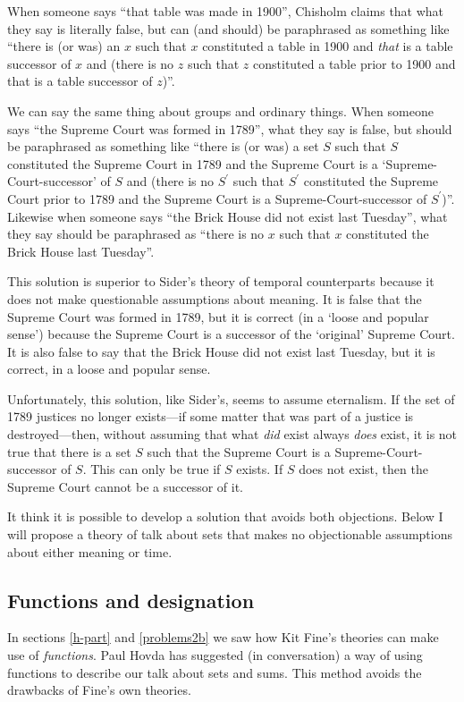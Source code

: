 \documentclass[11pt]{article}
\begin{document}
\begin{spacing}{1.5}
When someone says ``that table was made in 1900'', Chisholm claims
that what they say is literally false, but can (and should) be
paraphrased as something like ``there is (or was) an $x$ such that $x$
constituted a table in 1900 and {\em that} is a table successor of $x$
and (there is no $z$ such that $z$ constituted a table prior to 1900
and that is a table successor of $z$)''.

We can say the same thing about groups and ordinary things.  When
someone says ``the Supreme Court was formed in 1789'', what they say
is false, but should be paraphrased as something like ``there is (or
was) a set $S$ such that $S$ constituted the Supreme Court in 1789 and
the Supreme Court is a `Supreme-Court-successor' of $S$ and (there is
no $S^{\prime}$ such that $S^{\prime}$ constituted the Supreme Court
prior to 1789 and the Supreme Court is a Supreme-Court-successor of
$S^{\prime}$)''.  Likewise when someone says ``the Brick House did not
exist last Tuesday'', what they say should be paraphrased as ``there
is no $x$ such that $x$ constituted the Brick House last Tuesday''.

This solution is superior to Sider's theory of temporal counterparts
because it does not make questionable assumptions about meaning.  It
is false that the Supreme Court was formed in 1789, but it is correct
(in a `loose and popular sense') because the Supreme Court is a
successor of the `original' Supreme Court.  It is also false to say
that the Brick House did not exist last Tuesday, but it is correct, in
a loose and popular sense.

Unfortunately, this solution, like Sider's, seems to assume
eternalism.  If the set of 1789 justices no longer exists---if some
matter that was part of a justice is destroyed---then, without
assuming that what {\em did} exist always {\em does} exist, it is not
true that there is a set $S$ such that the Supreme Court is a
Supreme-Court-successor of $S$.  This can only be true if $S$ exists.
If $S$ does not exist, then the Supreme Court cannot be a successor of
it.

It think it is possible to develop a solution that avoids both
objections.  Below I will propose a theory of talk about sets that
makes no objectionable assumptions about either meaning or time.

\subsection{Functions and designation}
\label{fundeg}
In sections \ref{h-part} and \ref{problems2b} we saw how Kit Fine's
theories can make use of {\em functions}.  Paul Hovda has suggested
(in conversation) a way of using functions to describe our talk about
sets and sums.  This method avoids the drawbacks of Fine's own
theories.


\end{spacing}
\end{document}
